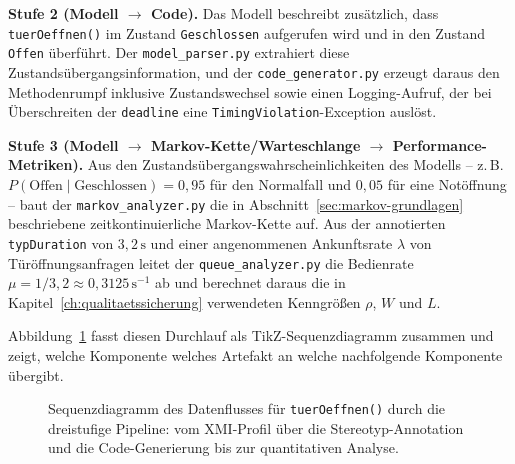 ﻿\documentclass[a4paper,12pt]{report}
\theoremstyle{definition}
\begin{document}
\textbf{Stufe 2 (Modell $\to$ Code).} Das Modell beschreibt zusätzlich, dass
\texttt{tuerOeffnen()} im Zustand \texttt{Geschlossen} aufgerufen wird und in
den Zustand \texttt{Offen} überführt. Der \texttt{model\_parser.py}
extrahiert diese Zustandsübergangsinformation, und der
\texttt{code\_generator.py} erzeugt daraus den Methodenrumpf inklusive
Zustandswechsel sowie einen Logging-Aufruf, der bei Überschreiten der
\texttt{deadline} eine \texttt{TimingViolation}-Exception auslöst.

\textbf{Stufe 3 (Modell $\to$ Markov-Kette/Warteschlange $\to$
Performance-Metriken).} Aus den Zustandsübergangswahrscheinlichkeiten des
Modells -- z.\,B. $P(\text{Offen} \mid \text{Geschlossen}) = 0{,}95$ für den
Normalfall und $0{,}05$ für eine Notöffnung -- baut der
\texttt{markov\_analyzer.py} die in Abschnitt~\ref{sec:markov-grundlagen}
beschriebene zeitkontinuierliche Markov-Kette auf. Aus der annotierten
\texttt{typDuration} von $3{,}2\,\text{s}$ und einer angenommenen
Ankunftsrate $\lambda$ von Türöffnungsanfragen leitet der
\texttt{queue\_analyzer.py} die Bedienrate $\mu = 1/3{,}2 \approx
0{,}3125\,\text{s}^{-1}$ ab und berechnet daraus die in
Kapitel~\ref{ch:qualitaetssicherung} verwendeten Kenngrößen $\rho$, $W$ und
$L$.

Abbildung~\ref{fig:pipeline-sequence} fasst diesen Durchlauf als
TikZ-Sequenzdiagramm zusammen und zeigt, welche Komponente welches Artefakt
an welche nachfolgende Komponente übergibt.

\begin{figure}[H]
\centering
{}
\caption{Sequenzdiagramm des Datenflusses für \texttt{tuerOeffnen()} durch
die dreistufige Pipeline: vom XMI-Profil über die Stereotyp-Annotation und
die Code-Generierung bis zur quantitativen Analyse.}
\label{fig:pipeline-sequence}
\end{figure}
\end{document}

